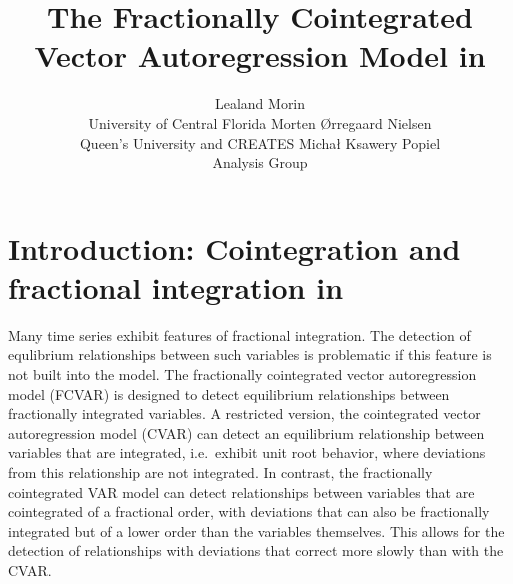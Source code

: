 \documentclass[article]{jss}
\author{Lealand Morin\\University of Central Florida
   \And Morten \O rregaard Nielsen\\Queen's University and CREATES
   \AND Micha\l{} Ksawery Popiel\\Analysis Group}
\title{The Fractionally Cointegrated Vector Autoregression Model in \proglang{R}}
\begin{document}


\section[Introduction: Cointegration and fractional integration in R]{Introduction: Cointegration and fractional integration in } \label{sec:intro}

% 

Many time series exhibit features of fractional integration. 
The detection of equlibrium relationships between such variables is problematic if this feature is not built into the model. 
% 
The fractionally cointegrated vector autoregression model (FCVAR) is designed to detect equilibrium relationships between fractionally integrated variables. 
A restricted version, the cointegrated vector autoregression model (CVAR) can detect an equilibrium relationship between variables that are integrated, i.e.~exhibit unit root behavior, where deviations from this relationship are not integrated. 
In contrast, the fractionally cointegrated VAR model can detect relationships between variables that are cointegrated of a fractional order, with deviations that can also be fractionally integrated but of a lower order than the variables themselves. 
This allows for the detection of relationships with deviations that correct more slowly than with the CVAR. 
% 
\end{document}
